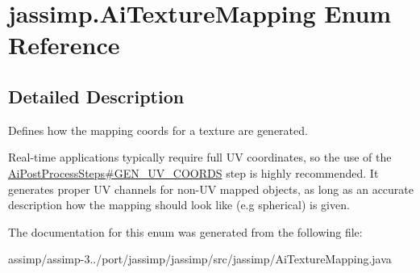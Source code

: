 \hypertarget{enumjassimp_1_1_ai_texture_mapping}{\section{jassimp.\+Ai\+Texture\+Mapping Enum Reference}
\label{enumjassimp_1_1_ai_texture_mapping}
}


\subsection{Detailed Description}
Defines how the mapping coords for a texture are generated.

Real-\/time applications typically require full U\+V coordinates, so the use of the \hyperlink{enumjassimp_1_1_ai_post_process_steps_a828a5efc49f107dce2ce4c4bcf11167c}{Ai\+Post\+Process\+Steps\#\+G\+E\+N\+\_\+\+U\+V\+\_\+\+C\+O\+O\+R\+D\+S} step is highly recommended. It generates proper U\+V channels for non-\/\+U\+V mapped objects, as long as an accurate description how the mapping should look like (e.\+g spherical) is given. 

The documentation for this enum was generated from the following file\+:\begin{DoxyCompactItemize}
\item 
assimp/assimp-\/3../port/jassimp/jassimp/src/jassimp/Ai\+Texture\+Mapping.\+java\end{DoxyCompactItemize}
